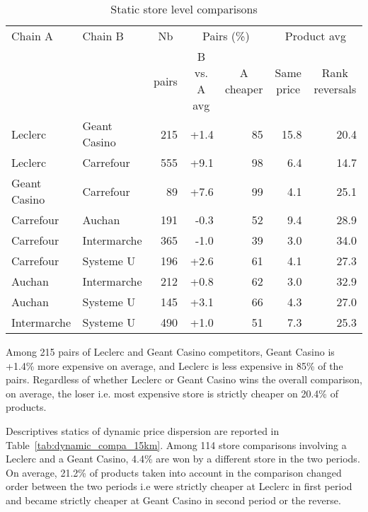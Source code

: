 \documentclass[english]{article}
\begin{document}
\begin{table}[htbp]
\caption{Static store level comparisons}
\label{tab:static_compa_15km}
\begin{threeparttable}
\begin{tabular}{llr|rr|rr}
\toprule
\toprule
    Chain A & Chain B & \multicolumn{1}{c|}{Nb} & \multicolumn{2}{c|}{Pairs  (\%)} & \multicolumn{2}{c}{Product avg} \\
          &       & \multicolumn{1}{c|}{pairs} & \multicolumn{1}{c}{B vs. A avg} & \multicolumn{1}{c|}{A cheaper } & \multicolumn{1}{c}{Same price} & \multicolumn{1}{c}{Rank reversals} \\
    \midrule
    Leclerc & Geant Casino & 215   & +1.4  & 85    & 15.8  & 20.4 \\
    Leclerc & Carrefour & 555   & +9.1  & 98    & 6.4   & 14.7 \\
    Geant Casino & Carrefour & 89    & +7.6  & 99    & 4.1   & 25.1 \\
    Carrefour & Auchan & 191   & -0.3  & 52    & 9.4   & 28.9 \\
    Carrefour & Intermarche & 365   & -1.0  & 39    & 3.0   & 34.0 \\
    Carrefour & Systeme U & 196   & +2.6  & 61    & 4.1   & 27.3 \\
    Auchan & Intermarche & 212   & +0.8  & 62    & 3.0   & 32.9 \\
    Auchan & Systeme U & 145   & +3.1  & 66    & 4.3   & 27.0 \\
    Intermarche & Systeme U & 490   & +1.0  & 51    & 7.3   & 25.3 \\
    \bottomrule
    \bottomrule
\end{tabular}
\begin{tablenotes}
      \small
      \item Among 215 pairs of Leclerc and Geant Casino competitors, Geant Casino is +1.4\% more expensive on average, and Leclerc is less expensive in 85\% of the pairs. Regardless of whether Leclerc or Geant Casino wins the overall comparison, on average, the loser i.e. most expensive store is strictly cheaper on 20.4\% of products.
\end{tablenotes}
\end{threeparttable}
\end{table}

Descriptives statics of dynamic price dispersion are reported in Table~\ref{tab:dynamic_compa_15km}. Among 114 store comparisons involving a Leclerc and a Geant Casino, 4.4\% are won by a different store in the two periods. On average, 21.2\% of products taken into account in the comparison changed order between the two periods i.e were strictly cheaper at Leclerc in first period and became strictly cheaper at Geant Casino in second period or the reverse.
\end{document}
